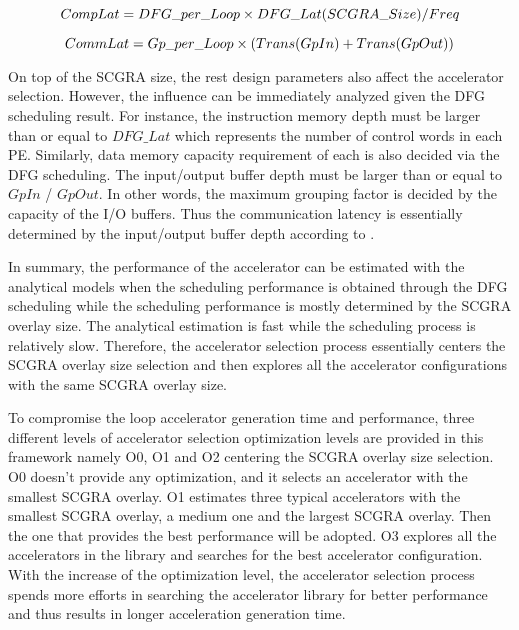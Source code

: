 \begin{equation} \label{eq:comp-lat}
    \footnotesize
    CompLat = DFG\_per\_Loop \times DFG\_Lat(SCGRA\_Size) / Freq
\vspace{-2em}
\end{equation}

\begin{equation} \label{eq:comm-lat}
    \footnotesize
    CommLat = Gp\_per\_Loop \times (Trans(GpIn) + Trans(GpOut))
\end{equation}

On top of the SCGRA size, the rest design parameters also affect the accelerator selection. However, the influence can be immediately analyzed given the DFG scheduling result. For instance, the instruction memory depth must be larger than or equal to $DFG\_Lat$ which represents the number of control words in each PE. Similarly, data memory capacity requirement of each is also decided via the DFG scheduling. The input/output buffer depth must be larger than or equal to $GpIn$ / $GpOut$. In other words, the maximum grouping factor is decided by the capacity of the I/O buffers. Thus the communication latency is essentially determined by the input/output buffer depth according to .

In summary, the performance of the accelerator can be estimated with the analytical models when the scheduling performance is obtained through the DFG scheduling while the scheduling performance is mostly determined by the SCGRA overlay size. The analytical estimation is fast while the scheduling process is relatively slow. Therefore, the accelerator selection process essentially centers the SCGRA overlay size selection and then explores all the accelerator configurations with the same SCGRA overlay size. 

To compromise the loop accelerator generation time and performance, three different levels of accelerator selection optimization levels are provided in this framework namely O0, O1 and O2 centering the SCGRA overlay size selection.
O0 doesn't provide any optimization, and it selects an accelerator with the smallest SCGRA overlay. O1 estimates three typical accelerators with the smallest SCGRA overlay, a medium one and the largest SCGRA overlay. Then the one that provides the best performance will be adopted. O3 explores all the accelerators in the library and searches for the best accelerator configuration. With the increase of the optimization level, the accelerator selection process spends more efforts in searching the accelerator library for better performance and thus results in longer acceleration generation time.

